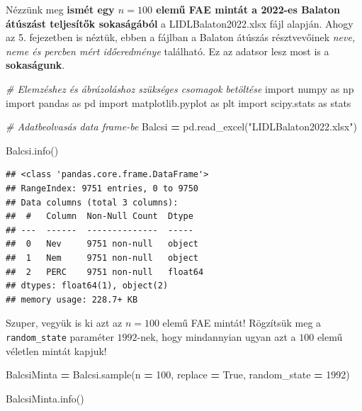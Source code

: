 \documentclass[
]{book}
\newenvironment{Shaded}{\begin{snugshade}}{\end{snugshade}}
\newcommand{\CommentTok}[1]{\textcolor[rgb]{0.56,0.35,0.01}{\textit{#1}}}
\newcommand{\DecValTok}[1]{\textcolor[rgb]{0.00,0.00,0.81}{#1}}
\newcommand{\ImportTok}[1]{#1}
\newcommand{\NormalTok}[1]{#1}
\newcommand{\OperatorTok}[1]{\textcolor[rgb]{0.81,0.36,0.00}{\textbf{#1}}}
\newcommand{\StringTok}[1]{\textcolor[rgb]{0.31,0.60,0.02}{#1}}
\newcommand{\VariableTok}[1]{\textcolor[rgb]{0.00,0.00,0.00}{#1}}
\begin{document}
Nézzünk meg \textbf{ismét egy \(n=100\) elemű FAE mintát a 2022-es Balaton átúszást teljesítők sokaságából} a LIDLBalaton2022.xlsx fájl alapján.
Ahogy az 5. fejezetben is néztük, ebben a fájlban a Balaton átúszás résztvevőinek \emph{neve, neme és percben mért időeredménye} található. Ez az adatsor lesz most is a \textbf{sokaságunk}.

\begin{Shaded}
\begin{Highlighting}[]
\CommentTok{\# Elemzéshez és ábrázoláshoz szükséges csomagok betöltése}
\ImportTok{import}\NormalTok{ numpy }\ImportTok{as}\NormalTok{ np}
\ImportTok{import}\NormalTok{ pandas }\ImportTok{as}\NormalTok{ pd}
\ImportTok{import}\NormalTok{ matplotlib.pyplot }\ImportTok{as}\NormalTok{ plt}
\ImportTok{import}\NormalTok{ scipy.stats }\ImportTok{as}\NormalTok{ stats}

\CommentTok{\# Adatbeolvasás data frame{-}be}
\NormalTok{Balcsi }\OperatorTok{=}\NormalTok{ pd.read\_excel(}\StringTok{"LIDLBalaton2022.xlsx"}\NormalTok{)}

\NormalTok{Balcsi.info()}
\end{Highlighting}
\end{Shaded}

\begin{verbatim}
## <class 'pandas.core.frame.DataFrame'>
## RangeIndex: 9751 entries, 0 to 9750
## Data columns (total 3 columns):
##  #   Column  Non-Null Count  Dtype  
## ---  ------  --------------  -----  
##  0   Nev     9751 non-null   object 
##  1   Nem     9751 non-null   object 
##  2   PERC    9751 non-null   float64
## dtypes: float64(1), object(2)
## memory usage: 228.7+ KB
\end{verbatim}

Szuper, vegyük is ki azt az \(n=100\) elemű FAE mintát! Rögzítsük meg a \texttt{random\_state} paraméter \(1992\)-nek, hogy mindannyian ugyan azt a \(100\) elemű véletlen mintát kapjuk!

\begin{Shaded}
\begin{Highlighting}[]
\NormalTok{BalcsiMinta }\OperatorTok{=}\NormalTok{ Balcsi.sample(n }\OperatorTok{=} \DecValTok{100}\NormalTok{, replace }\OperatorTok{=} \VariableTok{True}\NormalTok{, random\_state }\OperatorTok{=} \DecValTok{1992}\NormalTok{)}

\NormalTok{BalcsiMinta.info()}
\end{Highlighting}
\end{Shaded}
\end{document}
